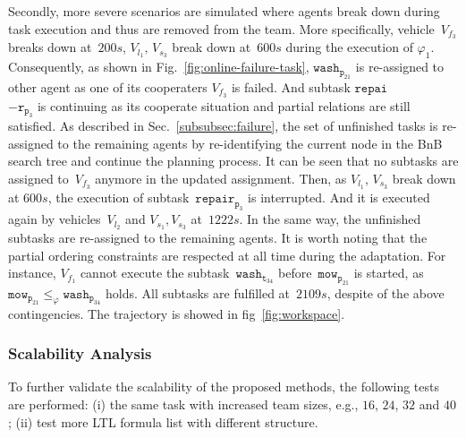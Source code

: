 Secondly, more severe scenarios are simulated where agents break down
during task execution and thus are removed from the team.
More specifically, vehicle~$V_{f_3}$ breaks down at~$200s$, $V_{l_1},\, V_{s_3}$ break
down at~$600s$ during the execution of $\varphi_1$.
Consequently, as shown in Fig.~\ref{fig:online-failure-task}, $\texttt{wash}_{\texttt{p}_{21}}$
is re-assigned to other agent as one of its cooperaters $V_{f_3}$ is failed. And subtask 
$\texttt{repai}$\\$-\texttt{r}_{\texttt{p}_{3}}$ is continuing as its cooperate situation and partial relations 
are still satisfied. As described in Sec.~\ref{subsubsec:failure},
the set of unfinished tasks is re-assigned to the remaining agents by re-identifying
the current node in the BnB search tree and continue the planning process.
It can be seen that no subtasks are assigned to~$V_{f_3}$ anymore in the updated assignment.
Then, as $V_{l_1},\, V_{s_3}$ break down at $600s$, the execution of subtask~$\texttt{repair}_{\texttt{p}_{3}}$ 
is interrupted. And it is executed again by vehicles~$V_{l_2}$ and $V_{s_1},V_{s_3}$ at~$1222s$.
In the same way, the unfinished subtasks are re-assigned to the remaining agents.
It is worth noting that the partial ordering constraints are respected at all
time during the adaptation.
For instance, $V_{f_1}$ cannot execute the subtask~$\texttt{wash}_{\texttt{t}_{34}}$
before~$\texttt{mow}_{\texttt{p}_{21}}$ is started,
as~$\texttt{mow}_{\texttt{p}_{21}}\leq_\varphi\texttt{wash}_{\texttt{p}_{34}}  $ holds.
All subtasks are fulfilled at~$2109s$, despite of the above contingencies.
The trajectory is showed in fig~\ref{fig:workspace}.


\subsubsection{Scalability Analysis}\label{subsubsec:scalable}
To further validate the scalability of the proposed methods,
the following tests are performed:
(i) the same task with increased team sizes,
e.g., $16$, $24$, $32$ and $40$;
(ii) test more LTL formula list with different structure. 

